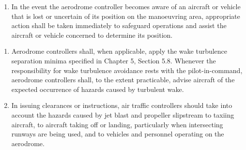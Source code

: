 \begin{enumeratesc}
\begin{enumerate}


        \item In the event the aerodrome controller becomes aware of an aircraft or vehicle that is lost or uncertain of its position on the manoeuvring area, appropriate action shall be taken immediately to safeguard operations and assist the aircraft or vehicle concerned to determine its position.
    \end{enumerate}

    \begin{enumerate}
        \item Aerodrome controllers shall, when applicable, apply the wake turbulence separation minima specified in Chapter 5, Section 5.8. Whenever the responsibility for wake turbulence avoidance rests with the pilot-in-command, aerodrome controllers shall, to the extent practicable, advise aircraft of the expected occurrence of hazards caused by turbulent wake.
        \item In issuing clearances or instructions, air traffic controllers should take into account the hazards caused by jet blast and propeller slipstream to taxiing aircraft, to aircraft taking off or landing, particularly when intersecting runways are being used, and to vehicles and personnel operating on the aerodrome.
    \end{enumerate}


\end{enumeratesc}
